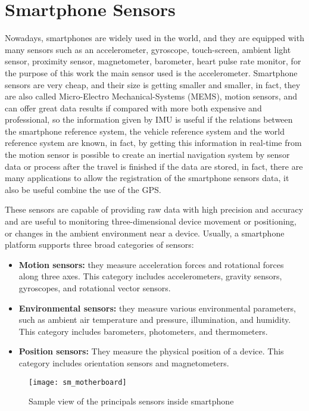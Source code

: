 \documentclass[tesi]{subfiles}
\begin{document}
\section{Smartphone Sensors}\label{sc:Smartphone Sensors}
Nowadays, smartphones are widely used in the world, and they are equipped with many sensors such as an accelerometer, gyroscope, touch-screen, ambient light sensor, proximity sensor, magnetometer, barometer, heart pulse rate monitor, for the purpose of this work the main sensor used is the accelerometer. Smartphone sensors are very cheap, and their size is getting smaller and smaller, in fact, they are also called Micro-Electro Mechanical-Systems (MEMS), motion sensors, and can offer great data results if compared with more both expensive and professional, so the information given by IMU is useful if the relations between the smartphone reference system, the vehicle reference system and the world reference system are known, in fact, by getting this information in real-time from the motion sensor is possible to create an inertial navigation system by sensor data or process after the travel is finished if the data are stored, in fact, there are many applications to allow the registration of the smartphone sensors data, it also be useful combine the use of the GPS.

These sensors are capable of providing raw data with high precision and accuracy and are useful to monitoring three-dimensional device movement or positioning, or changes in the ambient environment near a device.
Usually, a smartphone platform supports three broad categories of sensors\cite{Andro}:
\begin{itemize}
	\item \textbf{Motion sensors:} they measure acceleration forces and rotational forces along three axes. This category includes accelerometers, gravity sensors, gyroscopes, and rotational vector sensors.
	\item \textbf{Environmental sensors:} they measure various environmental parameters, such as ambient air temperature and pressure, illumination, and humidity. This category includes barometers, photometers, and thermometers.
	\item \textbf{Position sensors:} They measure the physical position of a device. This category includes orientation sensors and magnetometers.
\end{itemize}

\vspace{1cm}
\begin{figure}[H]
\centering
\texttt{[image: sm\_motherboard]}
\caption{Sample view of the principals sensors inside smartphone}
\label{fig:Sample smartphone sensors}
\end{figure}
\end{document}
